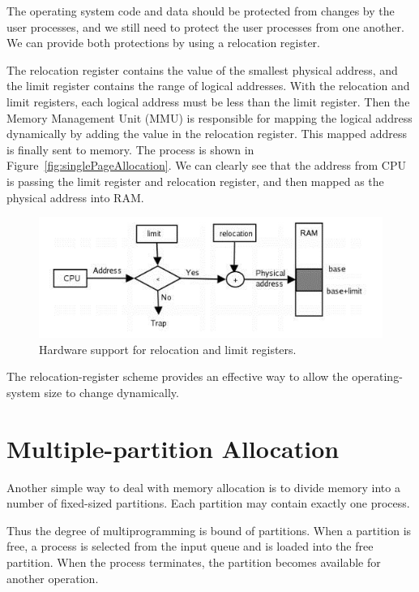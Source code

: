 \documentclass[doc,natbib,12pt]{apa6}
\begin{document}
	The operating system code and data should be protected from changes by the user processes, and we still need to protect the user processes from one another. We can provide both protections by using a relocation register.
	
	The relocation register contains the value of the smallest physical address, and the limit register contains the range of logical addresses. With the relocation and limit registers, each logical address must be less than the limit register. Then the Memory Management Unit (MMU) is responsible for mapping the logical address dynamically by adding the value in the relocation register. This mapped address is finally sent to memory. The process is shown in Figure~\vref{fig:singlePageAllocation}. We can clearly see that the address from CPU is passing the limit register and relocation register, and then mapped as the physical address into RAM.
	
	\begin{figure}[h]
		\centering
		\includegraphics[width=1\textwidth]{singlePageAllocation.jpg}
		\caption{\label{fig:singlePageAllocation}Hardware support for relocation and limit registers. \citep{Vissicomp2014}}
	\end{figure}
	
	The relocation-register scheme provides an effective way to allow the operating-system size to change dynamically.
	
	\newpage
	\section{Multiple-partition Allocation} \label{chp:MultiplePartitionAllocation}
	Another simple way to deal with memory allocation is to divide memory into a number of fixed-sized partitions. Each partition may contain exactly one process.
	
	Thus the degree of multiprogramming is bound of partitions. When a partition is free, a process is selected from the input queue and is loaded into the free partition. When the process terminates, the partition becomes available for another operation.
	
\end{document}
